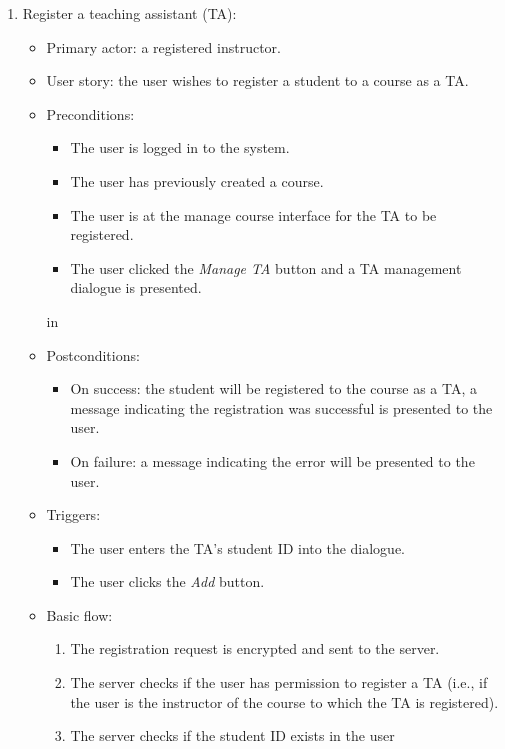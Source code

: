 \begin{enumerate}
\item Register a teaching assistant (TA):
\begin{itemize}
    \item Primary actor: a registered instructor.
    \item User story: the user wishes to register a student to a course as a
        TA.
    \item Preconditions:
        \begin{itemize}
            \item The user is logged in to the system.
            \item The user has previously created a course.
            \item The user is at the manage course interface for the TA
                to be registered.
            \item The user clicked the \emph{Manage TA} button and a TA
                management dialogue is presented.
        \end{itemize}
         in
    \item Postconditions:
        \begin{itemize}
            \item On success: the student will be registered to the course
                as a TA, a message indicating the registration was
                successful is presented to the user.
            \item On failure: a message indicating the error will be presented
                to the user.
        \end{itemize}
    \item Triggers:
        \begin{itemize}
            \item The user enters the TA's student ID into the dialogue.
            \item The user clicks the \emph{Add} button.
        \end{itemize}
    \item Basic flow:
        \begin{enumerate}
            \item The registration request is encrypted and sent to the server.
            \item The server checks if the user has permission to register a
                TA (i.e., if the user is the instructor of the course to which
                the TA is registered).
            \item The server checks if the student ID exists in the user

\end{enumerate}
\end{itemize}
\end{enumerate}
